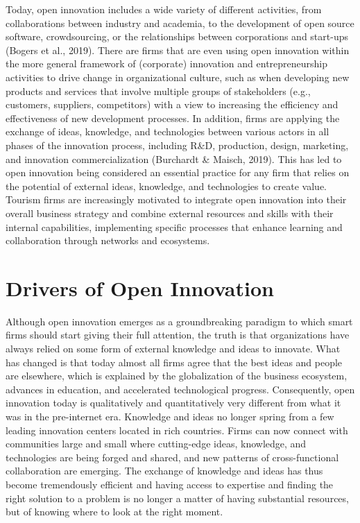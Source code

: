 \documentclass[
  letterpaper,
  DIV=11,
  numbers=noendperiod]{scrreprt}
\begin{document}
Today, open innovation includes a wide variety of different activities,
from collaborations between industry and academia, to the development of
open source software, crowdsourcing, or the relationships between
corporations and start-ups (Bogers et al., 2019). There are firms that
are even using open innovation within the more general framework of
(corporate) innovation and entrepreneurship activities to drive change
in organizational culture, such as when developing new products and
services that involve multiple groups of stakeholders (e.g., customers,
suppliers, competitors) with a view to increasing the efficiency and
effectiveness of new development processes. In addition, firms are
applying the exchange of ideas, knowledge, and technologies between
various actors in all phases of the innovation process, including R\&D,
production, design, marketing, and innovation commercialization
(Burchardt \& Maisch, 2019). This has led to open innovation being
considered an essential practice for any firm that relies on the
potential of external ideas, knowledge, and technologies to create
value. Tourism firms are increasingly motivated to integrate open
innovation into their overall business strategy and combine external
resources and skills with their internal capabilities, implementing
specific processes that enhance learning and collaboration through
networks and ecosystems.

\hypertarget{drivers-of-open-innovation}{%
\section{Drivers of Open Innovation}\label{drivers-of-open-innovation}}

Although open innovation emerges as a groundbreaking paradigm to which
smart firms should start giving their full attention, the truth is that
organizations have always relied on some form of external knowledge and
ideas to innovate. What has changed is that today almost all firms agree
that the best ideas and people are elsewhere, which is explained by the
globalization of the business ecosystem, advances in education, and
accelerated technological progress. Consequently, open innovation today
is qualitatively and quantitatively very different from what it was in
the pre-internet era. Knowledge and ideas no longer spring from a few
leading innovation centers located in rich countries. Firms can now
connect with communities large and small where cutting-edge ideas,
knowledge, and technologies are being forged and shared, and new
patterns of cross-functional collaboration are emerging. The exchange of
knowledge and ideas has thus become tremendously efficient and having
access to expertise and finding the right solution to a problem is no
longer a matter of having substantial resources, but of knowing where to
look at the right moment.
\end{document}
